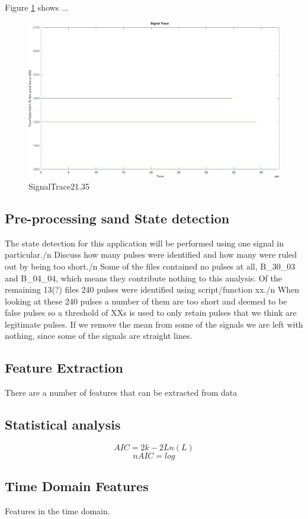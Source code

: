 \documentclass{article}
\begin{document}
Figure \ref{fig:SignalTrace21.35} shows ...
\begin{figure}[!ht]
    \centering
    \includegraphics[width=\textwidth, height=\textheight, keepaspectratio]{figures/SignalTrace21.35.png}
    \caption{SignalTrace21.35}
    \label{fig:SignalTrace21.35}
\end{figure}
\subsection{Pre-processing sand State detection}
The state detection for this application will be performed using one signal in particular./n
Discuss how many pulses were identified and how many were ruled out by being too short./n
Some of the files contained no pulses at all, B\_30\_03 and B\_04\_04, which means they contribute nothing to this analysis.
Of the remaining 13(?) files 240 pulses were identified using script/function xx./n
When looking at these 240 pulses a number of them are too short and deemed to be false pulses so a threshold of XXs is used to only retain pulses that we think are legitimate pulses.
If we remove the mean from some of the signals we are left with nothing, since some of the signals are straight lines.
\subsection{Feature Extraction}
There are a number of features that can be extracted from data 
\subsection{Statistical analysis}
$$ AIC = 2k - 2Ln(L) $$  
$$ nAIC = log $$
\subsection{Time Domain Features} 	
Features in the time domain.
\end{document}
